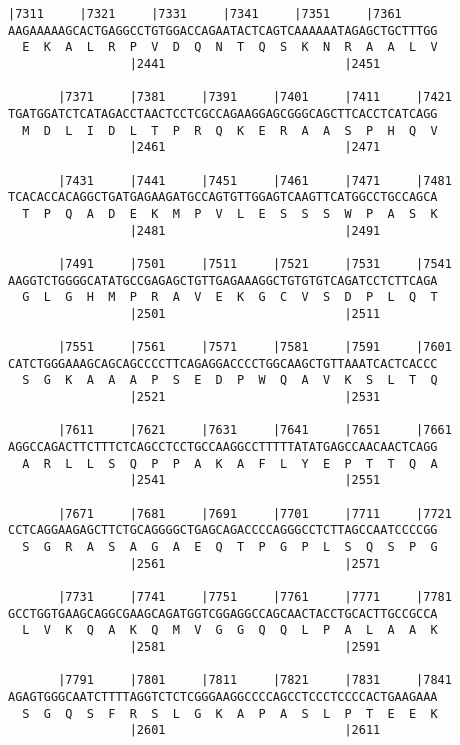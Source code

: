 \documentclass{article}
\begin{document}
\newpage
\begin{Verbatim}[fontfamily=courier]
       |7311     |7321     |7331     |7341     |7351     |7361
AAGAAAAAGCACTGAGGCCTGTGGACCAGAATACTCAGTCAAAAAATAGAGCTGCTTTGG
  E  K  A  L  R  P  V  D  Q  N  T  Q  S  K  N  R  A  A  L  V
                 |2441                         |2451        

       |7371     |7381     |7391     |7401     |7411     |7421
TGATGGATCTCATAGACCTAACTCCTCGCCAGAAGGAGCGGGCAGCTTCACCTCATCAGG
  M  D  L  I  D  L  T  P  R  Q  K  E  R  A  A  S  P  H  Q  V
                 |2461                         |2471        

       |7431     |7441     |7451     |7461     |7471     |7481
TCACACCACAGGCTGATGAGAAGATGCCAGTGTTGGAGTCAAGTTCATGGCCTGCCAGCA
  T  P  Q  A  D  E  K  M  P  V  L  E  S  S  S  W  P  A  S  K
                 |2481                         |2491        

       |7491     |7501     |7511     |7521     |7531     |7541
AAGGTCTGGGGCATATGCCGAGAGCTGTTGAGAAAGGCTGTGTGTCAGATCCTCTTCAGA
  G  L  G  H  M  P  R  A  V  E  K  G  C  V  S  D  P  L  Q  T
                 |2501                         |2511        

       |7551     |7561     |7571     |7581     |7591     |7601
CATCTGGGAAAGCAGCAGCCCCTTCAGAGGACCCCTGGCAAGCTGTTAAATCACTCACCC
  S  G  K  A  A  A  P  S  E  D  P  W  Q  A  V  K  S  L  T  Q
                 |2521                         |2531        

       |7611     |7621     |7631     |7641     |7651     |7661
AGGCCAGACTTCTTTCTCAGCCTCCTGCCAAGGCCTTTTTATATGAGCCAACAACTCAGG
  A  R  L  L  S  Q  P  P  A  K  A  F  L  Y  E  P  T  T  Q  A
                 |2541                         |2551        

       |7671     |7681     |7691     |7701     |7711     |7721
CCTCAGGAAGAGCTTCTGCAGGGGCTGAGCAGACCCCAGGGCCTCTTAGCCAATCCCCGG
  S  G  R  A  S  A  G  A  E  Q  T  P  G  P  L  S  Q  S  P  G
                 |2561                         |2571        

       |7731     |7741     |7751     |7761     |7771     |7781
GCCTGGTGAAGCAGGCGAAGCAGATGGTCGGAGGCCAGCAACTACCTGCACTTGCCGCCA
  L  V  K  Q  A  K  Q  M  V  G  G  Q  Q  L  P  A  L  A  A  K
                 |2581                         |2591        

       |7791     |7801     |7811     |7821     |7831     |7841
AGAGTGGGCAATCTTTTAGGTCTCTCGGGAAGGCCCCAGCCTCCCTCCCCACTGAAGAAA
  S  G  Q  S  F  R  S  L  G  K  A  P  A  S  L  P  T  E  E  K
                 |2601                         |2611        

\end{Verbatim}
\end{document}
